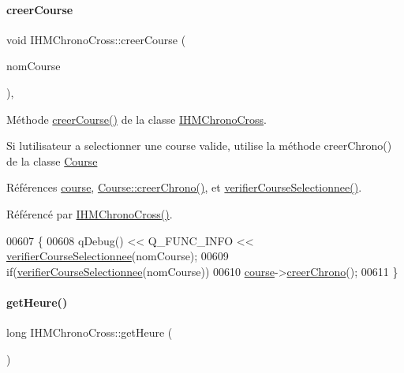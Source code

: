\paragraph{\texorpdfstring{creer\+Course}{creerCourse}}
{\footnotesize\ttfamily void I\+H\+M\+Chrono\+Cross\+::creer\+Course (\begin{DoxyParamCaption}\item[{Q\+String}]{nom\+Course }\end{DoxyParamCaption})\hspace{0.3cm}{\ttfamily [private]}, {\ttfamily [slot]}}



Méthode \hyperlink{class_i_h_m_chrono_cross_a3fc01e539c59645e0655e56e440f4b83}{creer\+Course()} de la classe \hyperlink{class_i_h_m_chrono_cross}{I\+H\+M\+Chrono\+Cross}. 

Si l\textquotesingle{}utilisateur a selectionner une course valide, utilise la méthode creer\+Chrono() de la classe \hyperlink{class_course}{Course} 

Références \hyperlink{class_i_h_m_chrono_cross_a03a8226c0e7f423d29302d9a06284ab4}{course}, \hyperlink{class_course_a6eb96222d8dc1f352e28f36e9b414448}{Course\+::creer\+Chrono()}, et \hyperlink{class_i_h_m_chrono_cross_afa7d1fb0245bb3e8bbffdf2687b02248}{verifier\+Course\+Selectionnee()}.



Référencé par \hyperlink{class_i_h_m_chrono_cross_a479fc90733fba3e65fb06aa4a3adc02e}{I\+H\+M\+Chrono\+Cross()}.


\begin{DoxyCode}
00607 \{
00608     qDebug() << Q\_FUNC\_INFO << \hyperlink{class_i_h_m_chrono_cross_afa7d1fb0245bb3e8bbffdf2687b02248}{verifierCourseSelectionnee}(nomCourse);
00609     \textcolor{keywordflow}{if}(\hyperlink{class_i_h_m_chrono_cross_afa7d1fb0245bb3e8bbffdf2687b02248}{verifierCourseSelectionnee}(nomCourse))
00610         \hyperlink{class_i_h_m_chrono_cross_a03a8226c0e7f423d29302d9a06284ab4}{course}->\hyperlink{class_course_a6eb96222d8dc1f352e28f36e9b414448}{creerChrono}();
00611 \}
\end{DoxyCode}
\mbox{\label{class_i_h_m_chrono_cross_a42054b4d5246c939bf0f621edb0e1aae}} 
\paragraph{\texorpdfstring{get\+Heure()}{getHeure()}}
{\footnotesize\ttfamily long I\+H\+M\+Chrono\+Cross\+::get\+Heure (\begin{DoxyParamCaption}{ }\end{DoxyParamCaption})\hspace{0.3cm}{\ttfamily [private]}}



